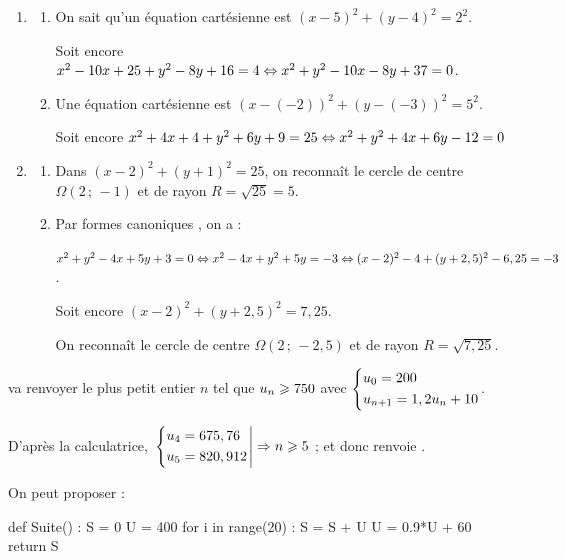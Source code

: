 \documentclass[a4paper,11pt]{article}
\begin{document}
\medskip


\begin{enumerate}
	\item 
	\begin{enumerate}
		\item On sait qu'un équation cartésienne est $(x-5)^2+(y-4)^2=2^2$.
		
		Soit encore $x^2-10x+25+y^2-8y+16=4 \Leftrightarrow x^2+y^2-10x-8y+37=0$.
		\item Une équation cartésienne est $(x-(-2))^2+(y-(-3))^2=5^2$.
		
		Soit encore $x^2+4x+4+y^2+6y+9=25 \Leftrightarrow x^2+y^2+4x+6y-12=0$
	\end{enumerate}
	\item 
	\begin{enumerate}
		\item Dans $(x-2)^2+(y+1)^2=25$, on reconnaît le cercle de centre $\Omega(2\,;\,-1)$ et de rayon $R=\sqrt{25}=5$.
		\item Par \og formes canoniques \fg, on a :
		
		$x^2+y^2-4x+5y+3=0 \Leftrightarrow x^2-4x+y^2+5y=-3 \Leftrightarrow (x-2)^2-4 + (y+2,5)^2-6,25=-3$.
		
		Soit encore $(x-2)^2 + (y+2,5)^2=7,25$.
		
		On reconnaît le cercle de centre $\Omega(2\,;\,-2,5)$ et de rayon $R=\sqrt{7,25}$.
	\end{enumerate}
\end{enumerate}

\medskip


\medskip

 va renvoyer le plus petit entier $n$ tel que $u_n \geqslant 750$ avec $\begin{dcases} u_0 = 200 \\ u_{n+1} = 1,2u_n + 10 \end{dcases}$.

D'après la calculatrice, $\left. \begin{dcases} u_{4} = 675,76 \\ u_{5} = 820,912 \end{dcases} \right| \Rightarrow n \geqslant 5$ ; et donc  renvoie .

\bigskip


\medskip

On peut proposer :

\begin{envcodepythontex}[largeur=8cm,lignes,centre=true]
	def Suite() :
		S = 0
		U = 400
		for i in range(20) :
			S = S + U
			U = 0.9*U + 60
		return S
\end{envcodepythontex}
\end{document}
